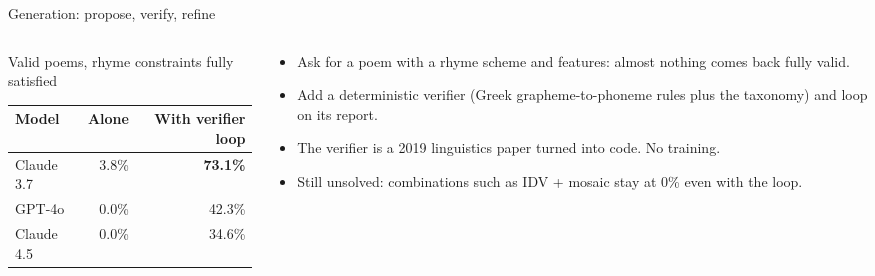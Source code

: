 \documentclass[aspectratio=169, 10pt]{beamer}
\newcommand{\hl}[1]{\textcolor{terracotta}{\textbf{#1}}}
\begin{document}
\begin{frame}{Generation: propose, verify, refine}
  \begin{columns}[T]
    \begin{column}{0.5\textwidth}
      \centering
      \footnotesize
      Valid poems, rhyme constraints fully satisfied\\[3pt]
      \begin{tabular}{lrr}
        \toprule
        \textbf{Model} & \textbf{Alone} & \textbf{With verifier loop} \\
        \midrule
        Claude 3.7 & 3.8\% & \hl{73.1\%} \\
        GPT-4o & 0.0\% & 42.3\% \\
        Claude 4.5 & 0.0\% & 34.6\% \\
        \bottomrule
      \end{tabular}
      \vspace{1.2em}
    \end{column}
    \begin{column}{0.48\textwidth}
      \begin{itemize}
        \item Ask for a poem with a rhyme scheme and features: almost nothing comes back fully valid.
        \item Add a deterministic verifier (Greek grapheme-to-phoneme rules plus the taxonomy) and loop on its report.
        \item The verifier is a 2019 linguistics paper turned into code. No training.
        \item Still unsolved: combinations such as IDV + mosaic stay at 0\% even with the loop.
      \end{itemize}
    \end{column}
  \end{columns}
\end{frame}
\end{document}
